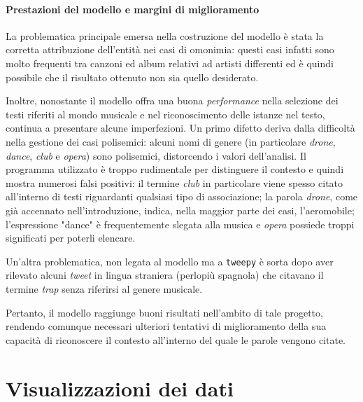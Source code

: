 \documentclass[12pt, a4paper, twocolumn]{article} %
\begin{document}
\subsection{Prestazioni del modello e margini di miglioramento}
La problematica principale emersa nella costruzione del modello è stata la corretta attribuzione dell'entità nei casi di omonimia: questi casi infatti sono molto frequenti tra canzoni ed album relativi ad artisti differenti ed è quindi possibile che il risultato ottenuto non sia quello desiderato.

Inoltre, nonostante il modello offra una buona \textit{performance} nella selezione dei testi riferiti al mondo musicale e nel riconoscimento delle istanze nel testo, continua a presentare alcune imperfezioni.
Un primo difetto deriva dalla difficoltà nella gestione dei casi polisemici: alcuni nomi di genere (in particolare \textit{drone}, \textit{dance}, \textit{club} e \textit{opera}) sono polisemici, distorcendo i valori dell'analisi.
Il programma utilizzato è troppo rudimentale per distinguere il contesto e quindi mostra numerosi falsi positivi: il termine \textit{club} in particolare viene spesso citato all'interno di testi riguardanti qualsiasi tipo di associazione; la parola \textit{drone}, come già accennato nell'introduzione, indica, nella maggior parte dei casi, l'aeromobile; l'espressione "dance" è frequentemente slegata alla musica e \textit{opera} possiede troppi significati per poterli elencare.

Un'altra problematica, non legata al modello ma a \verb|tweepy| è sorta dopo aver rilevato alcuni \textit{tweet} in lingua straniera (perlopiù spagnola) che citavano il termine \textit{trap} senza riferirsi al genere musicale.

Pertanto, il modello raggiunge buoni risultati nell'ambito di tale progetto, rendendo comunque necessari ulteriori tentativi di miglioramento della sua capacità di riconoscere il contesto all'interno del quale le parole vengono citate.

\hfill
\newpage
\part{Visualizzazioni dei dati}
\end{document}
